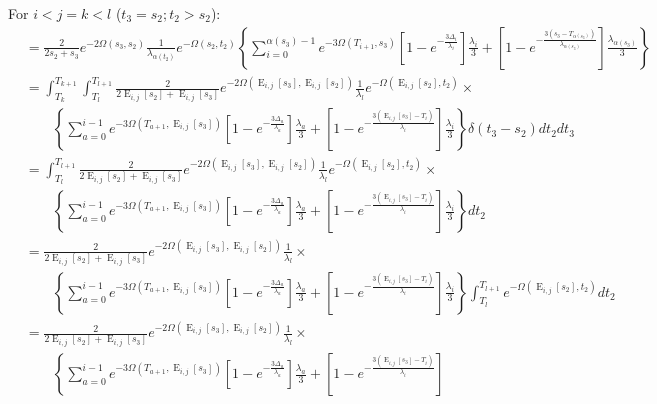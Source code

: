 \documentclass{article}
\DeclareMathOperator{\E}{E}
\begin{document}
For $i<j=k<l$ ($t_3=s_2; t_2>s_2$):
\begin{align*}
    &=\frac{2}{2s_2+s_3}e^{-2\Omega(s_3,s_2)}\frac{1}{\lambda_{\alpha(t_2)}}e^{-\Omega(s_2,t_2)}
    \left\{\sum_{i=0}^{\alpha(s_3)-1}e^{-3\Omega(T_{i+1},s_3)}
        \left[1-e^{-\frac{3\Delta_i}{\lambda_i}}\right]\frac{\lambda_i}{3}+
    \left[1-e^{-\frac{3\left(s_3-T_{\alpha(s_3)}\right)}{\lambda_{\alpha(s_3)}}}\right]
        \frac{\lambda_{\alpha(s_3)}}{3}\right\}\\
    &=\int_{T_k}^{T_{k+1}}\int_{T_l}^{T_{l+1}}
    \frac{2}{2\E_{i,j}[s_2]+\E_{i,j}[s_3]}e^{-2\Omega(\E_{i,j}[s_3],\E_{i,j}[s_2])}\frac{1}{\lambda_{l}}e^{-\Omega(\E_{i,j}[s_2],t_2)}\times\\
    &\qquad\left\{\sum_{a=0}^{i-1}e^{-3\Omega(T_{a+1},\E_{i,j}[s_3])}
        \left[1-e^{-\frac{3\Delta_a}{\lambda_a}}\right]\frac{\lambda_a}{3}+
    \left[1-e^{-\frac{3\left(\E_{i,j}[s_3]-T_{i}\right)}{\lambda_{i}}}\right]
        \frac{\lambda_{i}}{3}\right\}\delta(t_3-s_2)dt_2dt_3\\
    &=\int_{T_l}^{T_{l+1}}
    \frac{2}{2\E_{i,j}[s_2]+\E_{i,j}[s_3]}e^{-2\Omega(\E_{i,j}[s_3],\E_{i,j}[s_2])}\frac{1}{\lambda_{l}}e^{-\Omega(\E_{i,j}[s_2],t_2)}\times\\
    &\qquad\left\{\sum_{a=0}^{i-1}e^{-3\Omega(T_{a+1},\E_{i,j}[s_3])}
        \left[1-e^{-\frac{3\Delta_a}{\lambda_a}}\right]\frac{\lambda_a}{3}+
    \left[1-e^{-\frac{3\left(\E_{i,j}[s_3]-T_{i}\right)}{\lambda_{i}}}\right]
        \frac{\lambda_{i}}{3}\right\}dt_2\\
    &=
    \frac{2}{2\E_{i,j}[s_2]+\E_{i,j}[s_3]}e^{-2\Omega(\E_{i,j}[s_3],\E_{i,j}[s_2])}\frac{1}{\lambda_{l}}\times\\
    &\qquad\left\{\sum_{a=0}^{i-1}e^{-3\Omega(T_{a+1},\E_{i,j}[s_3])}
        \left[1-e^{-\frac{3\Delta_a}{\lambda_a}}\right]\frac{\lambda_a}{3}+
    \left[1-e^{-\frac{3\left(\E_{i,j}[s_3]-T_{i}\right)}{\lambda_{i}}}\right]
        \frac{\lambda_{i}}{3}\right\}
        \int_{T_l}^{T_{l+1}}e^{-\Omega(\E_{i,j}[s_2],t_2)}dt_2\\
    &=\frac{2}{2\E_{i,j}[s_2]+\E_{i,j}[s_3]}e^{-2\Omega(\E_{i,j}[s_3],\E_{i,j}[s_2])}\frac{1}{\lambda_{l}}\times\\
    &\qquad\left\{\sum_{a=0}^{i-1}e^{-3\Omega(T_{a+1},\E_{i,j}[s_3])}
        \left[1-e^{-\frac{3\Delta_a}{\lambda_a}}\right]\frac{\lambda_a}{3}+
    \left[1-e^{-\frac{3\left(\E_{i,j}[s_3]-T_{i}\right)}{\lambda_{i}}}\right]

\end{align*}
\end{document}
